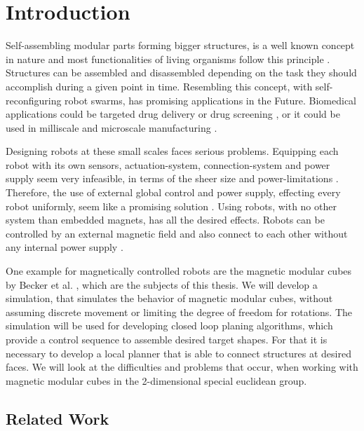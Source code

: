 \chapter{Introduction}

Self-assembling modular parts forming bigger structures, is a well known concept in nature and most functionalities of living organisms follow this principle \cite{bishop2005}.
Structures can be assembled and disassembled depending on the task they should accomplish during a given point in time. 
Resembling this concept, with self-reconfiguring robot swarms, has promising applications in the Future.
Biomedical applications could be targeted drug delivery or drug screening \cite{sitti2015}, or it could be used in milliscale and microscale manufacturing \cite{pelrine2016}.

Designing robots at these small scales faces serious problems.
Equipping each robot with its own sensors, actuation-system, connection-system and power supply seem very infeasible, in terms of the sheer size and power-limitations \cite{white2007}.
Therefore, the use of external global control and power supply, effecting every robot uniformly, seem like a promising solution \cite{white2007}.
Using robots, with no other system than embedded magnets, has all the desired effects.
Robots can be controlled by an external magnetic field and also connect to each other without any internal power supply \cite{saab2019}.

One example for magnetically controlled robots are the magnetic modular cubes by Becker et al. \cite{Becker2022}, which are the subjects of this thesis.
We will develop a simulation, that simulates the behavior of magnetic modular cubes, without assuming discrete movement or limiting the degree of freedom for rotations.
The simulation will be used for developing closed loop planing algorithms, which provide a control sequence to assemble desired target shapes.
For that it is necessary to develop a local planner that is able to connect structures at desired faces.
We will look at the difficulties and problems that occur, when working with magnetic modular cubes in the 2-dimensional special euclidean group.


\section{Related Work}

